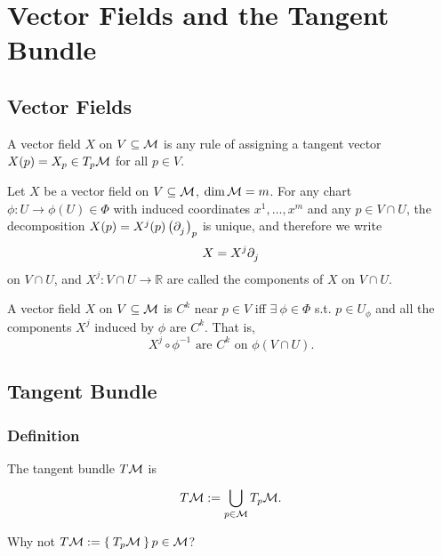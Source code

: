 \documentclass[../main.tex]{subfiles}
\begin{document}
    \section{Vector Fields and the Tangent Bundle}
    \subsection{Vector Fields}
    \begin{definition}\label{def:vector-fields}
        A vector field \(X\) on \(V \subseteq\manifold[M]\) is any rule of assigning 
        a tangent vector \(X(p) = X_p \in T_p\manifold[M]\) for all
        \(p \in V\).
    \end{definition}
    \begin{definition}\label{def:vector-field-component}
        Let \(X\) be a vector field on \(V \subseteq \manifold[M]\), 
        \(\dim \manifold[M] = m\). For any chart \(\phi : U \to \phi(U) \in \Phi\) 
        with induced coordinates \(x^1, \dots, x^m\) and any \(p \in V \cap U\), 
        the decomposition \(X(p) = X^j(p)\tvec{j}{p}\) is unique, and therefore 
        we write 
        \[
        X = X^j \tfld{j}
        \]
        on \(V \cap U\), and \(X^j : V \cap U \to \mathbb{R}\) are called the 
        components of \(X\) on \(V \cap U\).
    \end{definition}
    \begin{definition}\label{def:vec-field-smoothness}
        A vector field \(X\) on \(V \subseteq \manifold[M]\) is \(C^k\) near 
        \(p \in V\) iff \(\exists~\phi \in \Phi\) s.t. \(p \in U_\phi\) and all 
        the components \(X^j\) induced by \(\phi\) are \(C^k\). That is, 
        \[
        X^j\circ \phi ^{-1} \text{ are } C^k \text{ on } \phi(V \cap U).
        \]
    \end{definition}

    \subsection{Tangent Bundle}
    \subsubsection{Definition}
    \begin{definition}\label{def:tangent-bundle}
        The tangent bundle \(T\manifold[M]\) is 
        \[
        T\manifold[M] := \bigcup_{p \in \manifold[M]}^{} T_p\manifold[M].
        \]
    \end{definition}
    \begin{remark}
    Why not \(T\manifold[M] := \Set{T_p\manifold[M]}{p \in \manifold[M]}\)?
    \end{remark}
\end{document}

